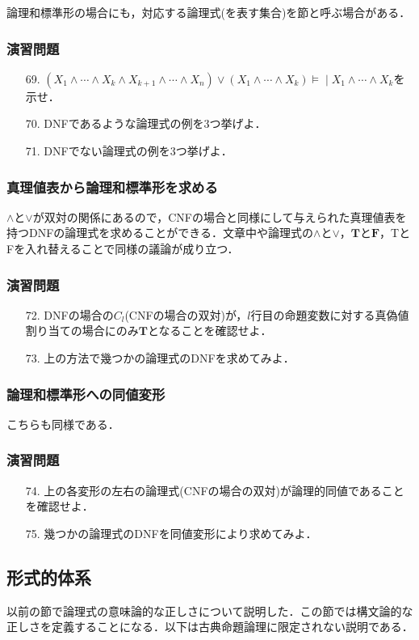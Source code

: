 \documentclass{ltjsarticle}
\theoremstyle{mystyle1}
\theoremstyle{mystyle2}
\newcommand{\bT}{\ensuremath{\mathbf{T}}}
\newcommand{\bF}{\ensuremath{\mathbf{F}}}
\newcommand{\lequiv}{\ensuremath{\models\!\mid}}
\begin{document}
論理和標準形の場合にも，対応する論理式(を表す集合)を節と呼ぶ場合がある．
\subsubsection*{演習問題}
\begin{enumerate}
  \item[69.] $(X_1\wedge\cdots\wedge X_k\wedge X_{k+1}\wedge\cdots\wedge X_n)\vee(X_1\wedge\cdots\wedge X_k)\lequiv X_1\wedge\cdots\wedge X_k$を示せ．
  \item[70.] DNFであるような論理式の例を3つ挙げよ．
  \item[71.] DNFでない論理式の例を3つ挙げよ．
\end{enumerate}
\subsubsection{真理値表から論理和標準形を求める}
$\wedge$と$\vee$が双対の関係にあるので，CNFの場合と同様にして与えられた真理値表を持つDNFの論理式を求めることができる．文章中や論理式の$\wedge$と$\vee$，$\bT$と$\bF$，TとFを入れ替えることで同様の議論が成り立つ．
\subsubsection*{演習問題}
\begin{enumerate}
  \item[72.] DNFの場合の$C_l$(CNFの場合の双対)が，$l$行目の命題変数に対する真偽値割り当ての場合にのみ$\bT$となることを確認せよ．
  \item[73.] 上の方法で幾つかの論理式のDNFを求めてみよ．
\end{enumerate}
\subsubsection{論理和標準形への同値変形}
こちらも同様である．
\subsubsection*{演習問題}
\begin{enumerate}
  \item[74.] 上の各変形の左右の論理式(CNFの場合の双対)が論理的同値であることを確認せよ．
  \item[75.] 幾つかの論理式のDNFを同値変形により求めてみよ．
\end{enumerate}

\subsection{形式的体系}
以前の節で論理式の意味論的な正しさについて説明した．この節では構文論的な正しさを定義することになる．以下は古典命題論理に限定されない説明である．
\end{document}
